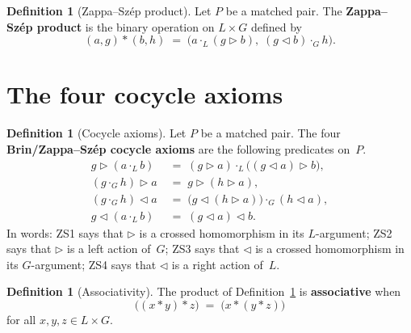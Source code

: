 \documentclass[11pt,a4paper]{article}
\theoremstyle{plain}
\theoremstyle{definition}
\newtheorem{definition}[theorem]{Definition}
\begin{document}
\begin{definition}[Zappa--Sz\'{e}p product]\label{def:zs-product}
Let $P$ be a matched pair. The \textbf{Zappa--Sz\'{e}p product} is the binary
operation on $L \times G$ defined by
\begin{equation}
  (a,g) * (b,h)
  \;=\;
  \bigl(
    a \cdot_L (g \triangleright b),\;
    (g \triangleleft b) \cdot_G h
  \bigr).
\end{equation}
\end{definition}

\section{The four cocycle axioms}

\begin{definition}[Cocycle axioms]\label{def:cocycles}
Let $P$ be a matched pair. The four \textbf{Brin/Zappa--Sz\'{e}p cocycle
axioms} are the following predicates on~$P$.
\begin{align}
  \tag{ZS1}
  g \triangleright (a \cdot_L b)
  &\;=\;
  (g \triangleright a)
    \cdot_L
  \bigl((g \triangleleft a) \triangleright b\bigr),
  \\[6pt]
  \tag{ZS2}
  (g \cdot_G h) \triangleright a
  &\;=\;
  g \triangleright (h \triangleright a),
  \\[6pt]
  \tag{ZS3}
  (g \cdot_G h) \triangleleft a
  &\;=\;
  \bigl(g \triangleleft (h \triangleright a)\bigr)
    \cdot_G
  (h \triangleleft a),
  \\[6pt]
  \tag{ZS4}
  g \triangleleft (a \cdot_L b)
  &\;=\;
  (g \triangleleft a) \triangleleft b.
\end{align}
In words: ZS1 says that $\triangleright$ is a crossed homomorphism in its
$L$-argument; ZS2 says that $\triangleright$ is a left action of~$G$; ZS3
says that $\triangleleft$ is a crossed homomorphism in its $G$-argument; ZS4
says that $\triangleleft$ is a right action of~$L$.
\end{definition}

\begin{definition}[Associativity]\label{def:assoc}
The product of Definition~\ref{def:zs-product} is \textbf{associative} when
\begin{equation}
  \bigl((x * y) * z\bigr) \;=\; \bigl(x * (y * z)\bigr)
\end{equation}
for all $x,y,z \in L \times G$.
\end{definition}
\end{document}
